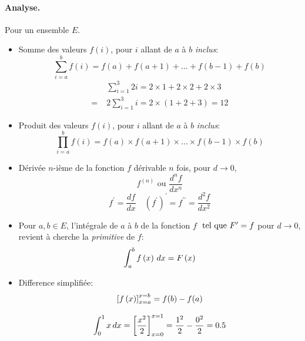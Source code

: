 \documentclass[12pt]{article}
\begin{document}
\paragraph{Analyse.}
Pour un ensemble $E$.
\begin{itemize}
    \item[\Ii] Somme des valeurs $f(i)$, pour $i$
        allant de $a$ à $b$ \textit{inclus}: $$
            \sum_{i=a}^{b}{f(i)} 
          = f(a) + f(a+1) + \dots + f(b-1) + f(b)
         $$
        \Ex $$
        \begin{aligned}
            &\sum_{i=1}^{3}{2i} 
          = 2\times1 + 2\times2 + 2\times3 \\
          = \; &2\sum_{i=1}^{3}{i}
          = 2 \times (1 + 2 + 3)
          = 12
        \end{aligned}
        $$
    
    \item Produit des valeurs $f(i)$, pour $i$
        allant de $a$ à $b$ \textit{inclus}: $$
            \prod_{i=a}^{b}{f(i)}
          = f(a) \times f(a+1) \times \dots \times f(b-1) \times f(b)
        $$

    \item[\Ii] Dérivée $n$-ième de la fonction $f$ dérivable $n$ fois, pour $d \to 0$, $$
        f^{(n)} \text{ ou } \frac{d^{n}f}{dx^{n}}
    $$
        \Ex $$
            f^\prime = \frac{df}{dx} \quad 
            (f^{\prime})^{\prime} = f^{\prime\prime} = \frac{d^{2}f}{dx^2}
        $$
    \item[\Ii] Pour $a, b \in E$, l'intégrale de $a$ à $b$ de la fonction $f$ 
        $\text{ tel que } F^{\prime} = f$ pour $d \to 0$,  
        revient à cherche la \textit{primitive} de $f$:
        $$
            \int_{a}^{b}{f\left(x\right)\,dx} = F\left(x\right)
        $$
    \item Difference simplifiée: $$
        \left[f\left(x\right)\right]_{x=a}^{x=b} = f(b) - f(a) 
    $$

        \Ex
        $$
            \int_{0}^{1}{x\,dx}
          = \left[\frac{x^2}{2}\right]_{x=0}^{x=1}
          = \frac{1^2}{2} - \frac{0^2}{2}
          = 0.5
        $$
\end{itemize}
\end{document}
